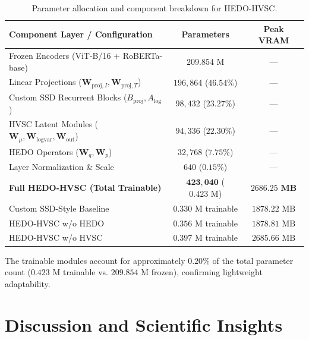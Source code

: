 \documentclass[journal]{IEEEtran}
\begin{document}
\begin{table}[!t]
\centering
\scriptsize
\caption{Parameter allocation and component breakdown for HEDO-HVSC.}
\label{tab:parameters_breakdown}
\setlength{\tabcolsep}{2.5pt}
\renewcommand{\arraystretch}{1.08}
\begin{tabular}{lcc}
\toprule
\textbf{Component Layer / Configuration} & \textbf{Parameters} & \textbf{Peak VRAM} \\
\midrule
Frozen Encoders (ViT-B/16 + RoBERTa-base) & $209.854\text{ M}$ & --- \\
Linear Projections ($\mathbf{W}_{\text{proj}, I}, \mathbf{W}_{\text{proj}, T}$) & $196{,}864$ ($46.54\%$) & --- \\
Custom SSD Recurrent Blocks ($B_{\text{proj}}, A_{\text{log}}$) & $98{,}432$ ($23.27\%$) & --- \\
HVSC Latent Modules ($\mathbf{W}_\mu, \mathbf{W}_{\text{logvar}}, \mathbf{W}_{\text{out}}$) & $94{,}336$ ($22.30\%$) & --- \\
HEDO Operators ($\mathbf{W}_q, \mathbf{W}_p$) & $32{,}768$ ($7.75\%$) & --- \\
Layer Normalization \& Scale & $640$ ($0.15\%$) & --- \\
\midrule
\textbf{Full HEDO-HVSC (Total Trainable)} & $\mathbf{423{,}040}$ ($0.423\text{ M}$) & $\mathbf{2686.25\text{ MB}}$ \\
\midrule
Custom SSD-Style Baseline & $0.330\text{ M}$ trainable & $1878.22\text{ MB}$ \\
HEDO-HVSC w/o HEDO & $0.356\text{ M}$ trainable & $1878.81\text{ MB}$ \\
HEDO-HVSC w/o HVSC & $0.397\text{ M}$ trainable & $2685.66\text{ MB}$ \\
\bottomrule
\end{tabular}
\end{table}

The trainable modules account for approximately $0.20\%$ of the total parameter count ($0.423\text{ M}$ trainable vs. $209.854\text{ M}$ frozen), confirming lightweight adaptability.

\section{Discussion and Scientific Insights}
\label{sec:discussion}
\end{document}
